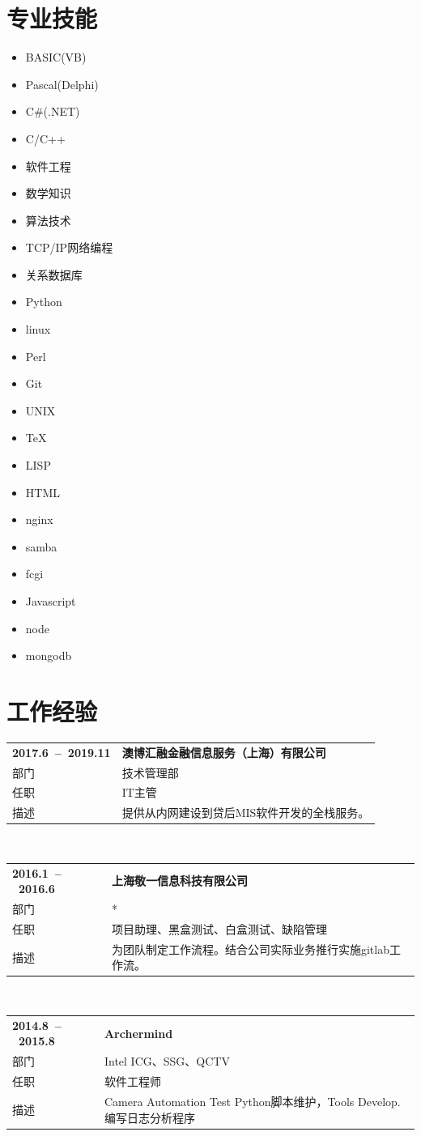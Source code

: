\documentclass{resumecls}
\newlength{\TableWidth}\setlength{\TableWidth}{\textwidth}
\newcommand{\WorkExperience}[5]{
    \noindent
    \begin{tabularx}{\TableWidth}{>{\hsize=0.382\hsize}XX}
    \textbf{#1}  & \textbf{#2}\\
    部门         & #3\\
    任职         & #4\\
    描述         & #5
    \end{tabularx} \\
}
\begin{document}
\section{专业技能}
    \begin{multicols}{4}
    \begin{itemize}
      \item[]BASIC(VB)
      \item[]Pascal(Delphi)
      \item[]C\#(.NET)
      \item[]C/C++
      \item[]软件工程
      \item[]数学知识
      \item[]算法技术
      \item[]TCP/IP网络编程
      \item[]关系数据库
      \item[]Python
      \item[]linux
      \item[]Perl
      \item[]Git
      \item[]UNIX
      \item[]\TeX
      \item[]LISP
      \item[]HTML
      \item[]nginx
      \item[]samba
      \item[]fcgi
      \item[]Javascript
      \item[]node
      \item[]mongodb
    \end{itemize}
    \end{multicols}
\section{工作经验}
    \WorkExperience
        {2017.6~--~2019.11}
        {澳博汇融金融信息服务（上海）有限公司}
        {技术管理部}
        {IT主管}
        {提供从内网建设到贷后MIS软件开发的全栈服务。}
    \WorkExperience
        {2016.1~--~2016.6}
        {上海敬一信息科技有限公司}
        {*}
        {项目助理、黑盒测试、白盒测试、缺陷管理}
        {为团队制定工作流程。结合公司实际业务推行实施gitlab工作流。}
        
    \WorkExperience
        {2014.8~--~2015.8}
        {Archermind}
        {Intel ICG、SSG、QCTV}
        {软件工程师}
        {Camera Automation Test Python脚本维护，Tools Develop.编写日志分析程序}
\end{document}
